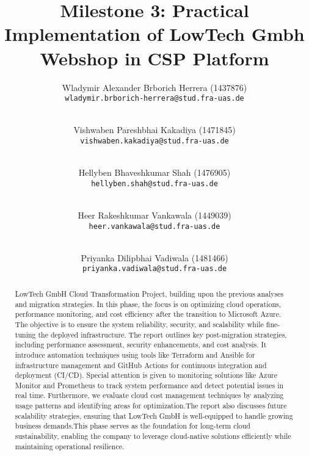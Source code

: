 \documentclass{llncs}
\newcommand{\what}{Milestone 3: Practical Implementation of LowTech Gmbh Webshop in CSP Platform}
\begin{document}
%
%
%
\mainmatter              %
%
\title{\what}
%
\author{
    Wladymir Alexander Brborich Herrera (1437876)\\
    \texttt{wladymir.brborich-herrera@stud.fra-uas.de}
    \and\\
    Vishwaben Pareshbhai Kakadiya (1471845)\\
    \texttt{vishwaben.kakadiya@stud.fra-uas.de}
    \and\\
    Hellyben Bhaveshkumar Shah (1476905)\\
    \texttt{hellyben.shah@stud.fra-uas.de}
    \and\\
    Heer Rakeshkumar Vankawala (1449039)
    \\
    \texttt{heer.vankawala@stud.fra-uas.de}
    \and\\
    Priyanka Dilipbhai Vadiwala (1481466)\\
    \texttt{priyanka.vadiwala@stud.fra-uas.de}
}
%

\maketitle              %


\begin{abstract}
    LowTech GmbH Cloud Transformation Project, building upon the previous analyses and migration strategies. In this phase, 
    the focus is on optimizing cloud operations, performance monitoring, and cost efficiency after the transition to Microsoft
    Azure. The objective is to ensure the system reliability, security, and scalability while fine-tuning the deployed infrastructure.
    The report outlines key post-migration strategies, including performance assessment, security enhancements, and cost analysis. 
    It introduce automation techniques using tools like Terraform and Ansible for infrastructure management and GitHub Actions for 
    continuous integration and deployment (CI/CD). Special attention is given to monitoring solutions like Azure Monitor and Prometheus
    to track system performance and detect potential issues in real time. Furthermore, we evaluate cloud cost management techniques by 
    analyzing usage patterns and identifying areas for optimization.The report also discusses future scalability strategies,
    ensuring that LowTech GmbH is well-equipped to handle growing business demands.This phase serves as the foundation for long-term 
    cloud sustainability, enabling the company to leverage cloud-native solutions efficiently while maintaining operational resilience.
\end{abstract}
\end{document}
